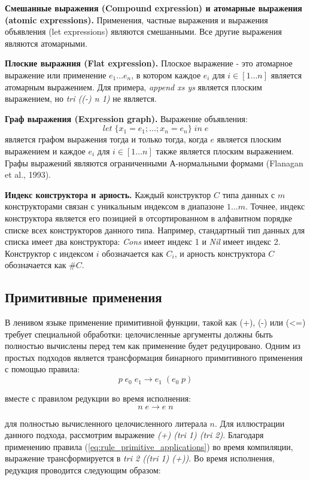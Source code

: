 \documentclass[14pt]{extarticle}
\begin{document}
\textbf{Смешанные выражения (Compound expression) и атомарные выражения (atomic expressions).} Применения, частные выражения и выражения объявления (let expressions) являются смешанными. Все другие выражения являются атомарными.

\textbf{Плоские выражния (Flat expression).} Плоское выражение - это атомарное выражение или применение $e_1 \ldots e_n$, в котором каждое $e_i$ для $i \in [1 \ldots n]$ является атомарным выражением. Для примера, \textit{append xs ys} является плоским выражением, но \textit{tri ((-) n 1)} не является.

\textbf{Граф выражения (Expression graph).} Выражение объявления:
$$
let \; \{ x_1 = e_1 ; \ldots ; x_n = e_n \} \; in \; e
$$
является графом выражения тогда и только тогда, когда $e$ является плоским выражением и каждое $e_i$ для $i \in [1 \ldots n]$ также является плоским выражением. Графы выражений являются ограниченными А-нормальными формами (Flanagan et al., 1993). 

\textbf{Индекс конструктора и арность.} Каждый конструктор $C$ типа данных с $m$ конструкторами связан с уникальным индексом в диапазоне $1 \ldots m$. Точнее, индекс конструктора является его позицией в отсортированном в алфавитном порядке списке всех конструкторов данного типа. Например, стандартный тип данных для списка имеет два конструктора: \textit{Cons} имеет индекс 1 и \textit{Nil} имеет индекс 2. Конструктор с индексом $i$ обозначается как $C_i$, и арность конструктора $C$ обозначается как $\#C$.

\subsection{Примитивные применения}
В ленивом языке применение примитивной функции, такой как (+), (-) или (<=) требует специальной обработки: целочисленные аргументы должны быть полностью вычислены перед тем как применение будет редуцировано. Одним из простых подходов является трансформация бинарного примитивного применения с помощью правила:
\begin{equation} \label{eq:rule_primitive_applications}
p \; e_0 \; e_1 \rightarrow e_1 \; (e_0 \; p)
\end{equation}

вместе с правилом редукции во время исполнения:
\begin{equation} \label{eq:reduce_primitive_applications}
n \; e \rightarrow e \; n
\end{equation}

для полностью вычисленного целочисленного литерала $n$. Для иллюстрации данного подхода, рассмотрим выражение \textit{(+) (tri 1) (tri 2)}. Благодаря применению правила (\ref{eq:rule_primitive_applications}) во время компиляции, выражение трансформируется в \textit{tri 2 ((tri 1) (+))}. Во время исполнения, редукция проводится следующим образом:
\end{document}

